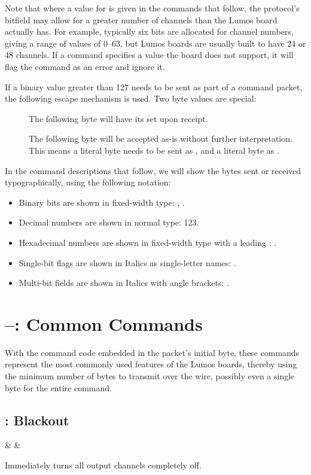 \documentclass[letterpaper,twoside,onecolumn,openright,final]{memoir}
\begin{document}
Note that where a value for  is given in the commands that follow, the protocol's bitfield
may allow for a greater number of channels than the Lumos board actually has.  For example, typically six bits
are allocated for channel numbers, giving a range of values of 0--63, but Lumos boards are usually built
to have 24 or 48 channels.  If a command specifies a  value the board does not support,
it will flag the command as an error and ignore it.

\label{escapebytes}If 
a binary value greater than 127 needs to be sent as part of a command packet, 
the following escape mechanism is used.  Two byte values are special:
\begin{description}
  \item[] The following byte will have its  set upon receipt.
  \item[] The following byte will be accepted as-is without further interpretation.  This
	means a literal  byte needs to be sent as  , and a literal
	 byte as  .
\end{description}

In the command descriptions that follow, we will show the bytes sent or received typographically, using the
following notation:
\begin{itemize}
	\item Binary bits are shown in fixed-width type: , .
	\item Decimal numbers are shown in normal type: 123.
	\item Hexadecimal numbers are shown in fixed-width type with a leading : .
	\item Single-bit flags are shown in Italics as single-letter names: .
	\item Multi-bit fields are shown in Italics with angle brackets: .
\end{itemize}

\section{--: Common Commands}
With the command code embedded in the packet's initial byte, these commands represent the most commonly
used features of the Lumos boards, thereby using the minimum number of bytes to transmit over the
wire, possibly even a single byte for the entire command.

\subsection{: Blackout}
\begin{BF}
   &  & 
\end{BF}
Immediately turns all output channels completely off.
\end{document}
